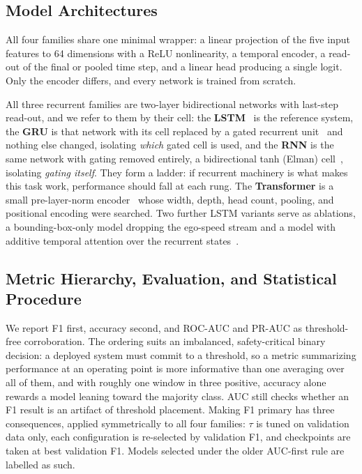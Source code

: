\documentclass[mti,article,submit,moreauthors]{Definitions/mdpi}
\begin{document}
\subsection{Model Architectures}
\label{sec:architectures}

All four families share one minimal wrapper: a linear projection of the five input features to 64 dimensions with a ReLU nonlinearity, a temporal encoder, a read-out of the final or pooled time step, and a linear head producing a single logit. Only the encoder differs, and every network is trained from scratch.

All three recurrent families are two-layer bidirectional networks with last-step read-out, and we refer to them by their cell: the \textbf{LSTM}~\citep{hochreiter1997lstm} is the reference system, the \textbf{GRU} is that network with its cell replaced by a gated recurrent unit~\citep{cho2014gru} and nothing else changed, isolating \emph{which} gated cell is used, and the \textbf{RNN} is the same network with gating removed entirely, a bidirectional tanh (Elman) cell~\citep{elman1990rnn}, isolating \emph{gating itself}. They form a ladder: if recurrent machinery is what makes this task work, performance should fall at each rung. The \textbf{Transformer} is a small pre-layer-norm encoder~\citep{vaswani2017attention} whose width, depth, head count, pooling, and positional encoding were searched. Two further LSTM variants serve as ablations, a bounding-box-only model dropping the ego-speed stream and a model with additive temporal attention over the recurrent states~\citep{bahdanau2015attention}.

\subsection{Metric Hierarchy, Evaluation, and Statistical Procedure}
\label{sec:metrics}

We report F1 first, accuracy second, and ROC-AUC and PR-AUC as threshold-free corroboration. The ordering suits an imbalanced, safety-critical binary decision: a deployed system must commit to a threshold, so a metric summarizing performance at an operating point is more informative than one averaging over all of them, and with roughly one window in three positive, accuracy alone rewards a model leaning toward the majority class. AUC still checks whether an F1 result is an artifact of threshold placement. Making F1 primary has three consequences, applied symmetrically to all four families: $\tau$ is tuned on validation data only, each configuration is re-selected by validation F1, and checkpoints are taken at best validation F1. Models selected under the older AUC-first rule are labelled as such.
\end{document}
